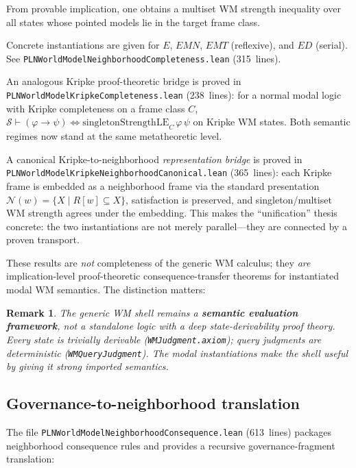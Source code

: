 \documentclass[]{article}
\newtheorem{remark}[theorem]{Remark}
\newcommand{\code}[1]{\texttt{#1}}
\begin{document}
\noindent
From provable implication, one obtains a multiset WM strength inequality
over all states whose pointed models lie in the target frame class.

Concrete instantiations are given for $E$, $\mathit{EMN}$,
$\mathit{EMT}$ (reflexive), and $\mathit{ED}$ (serial). See
\code{PLNWorldModelNeighborhoodCompleteness.lean} (315~lines).

An analogous Kripke proof-theoretic bridge is proved in
\code{PLNWorldModelKripkeCompleteness.lean} (238~lines): for a normal
modal logic with Kripke completeness on a frame class $C$,
$\mathcal{S} \vdash (\varphi \to \psi)
\iff \mathrm{singletonStrengthLE}_C\,\varphi\,\psi$
on Kripke WM states. Both semantic regimes now stand at the same
metatheoretic level.

A canonical Kripke-to-neighborhood \emph{representation bridge} is
proved in \code{PLNWorldModelKripkeNeighborhoodCanonical.lean}
(365~lines): each Kripke frame is embedded as a neighborhood frame
via the standard presentation $\mathcal{N}(w)=\{X\mid R[w]\subseteq X\}$,
satisfaction is preserved, and singleton/multiset WM strength agrees
under the embedding. This makes the ``unification'' thesis concrete:
the two instantiations are not merely parallel---they are connected by
a proven transport.

These results are \emph{not} completeness of the generic WM calculus;
they \emph{are} implication-level proof-theoretic consequence-transfer
theorems for
instantiated modal WM semantics. The distinction matters:

\begin{remark}
The generic WM shell remains a \textbf{semantic evaluation framework},
not a standalone logic with a deep state-derivability proof theory.
Every state is trivially derivable
(\code{WMJudgment.axiom}); query judgments are deterministic
(\code{WMQueryJudgment}). The modal instantiations make the shell
\emph{useful} by giving it strong imported semantics.
\end{remark}


\subsection{Governance-to-neighborhood translation}
\label{sec:gov-translation}

The file \code{PLNWorldModelNeighborhoodConsequence.lean} (613~lines)
packages neighborhood consequence rules and provides a recursive
governance-fragment translation:
\end{document}
